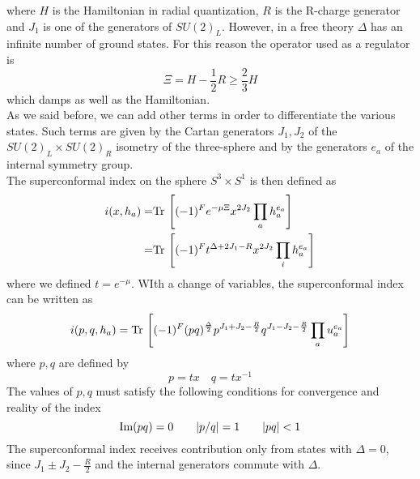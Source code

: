  where $H$ is the Hamiltonian in radial quantization, $R$ is the R-charge generator and $J_1$ is one of the generators of $SU(2)_L$. 
 However, in a free theory $\Delta$ has an infinite number of ground states. 
 For this reason the operator used as a regulator is \cite{Romelsberger:2005eg}
 \begin{equation}
 	\Xi = H - \frac{1}{2} R \geq \frac{2}{3} H 
 \end{equation}
 which damps as well as the Hamiltonian.\\
As we said before, we can add other terms in order to differentiate the various states.
Such terms are given by the Cartan generators $J_1, J_2$ of the $SU(2)_L \times SU(2)_R$ isometry of the three-sphere and by the generators $e_a$ of the internal symmetry group.\\
The superconformal index on the sphere $S^3 \times S^1$ is then defined as \cite{Romelsberger:2007ec}
\begin{align}
 i( x, h_a) =&
\mathrm{Tr } \, \left[ (-1)^F  e^{ - \mu \Xi} x^{2 J_2} \prod_a h_a^{e_a} \right] \\= &
\mathrm{Tr } \, \left[ (-1)^F  t^{\Delta +  2 J_1 - R} x^{2 J_2} \prod_i h_a^{e_a} \right] 
 \end{align} 
 where we defined $t = e^{- \mu}$.
WIth a change of variables, the superconformal index can be written as 
\begin{equation}
 i( p, q, h_a) =
 \Tr  \left[  (-1)^F 
 (pq)^{ \frac{\Delta}{2}} %
  p^{J_1 + J_2 - \frac{R}{2}} q^{J_1 - J_2 - \frac{R}{2} } \prod_a u_a^{e_a}    \right]
\end{equation}
where $p,q$ are defined by
\begin{equation}
p = t x \quad q = t x^{-1}
\end{equation}
The values of $p,q$ must satisfy the following conditions for convergence and reality of the index
\begin{equation}
\hbox{Im} (pq) =0 \qquad |p/q| =  1 \qquad | pq| < 1
\label{eqn:reality_convergence_condition_index}
\end{equation}
The superconformal index receives contribution only from states with $\Delta=0$, since $J_1 \pm J_2 - \frac{R}{2}$ and the internal generators commute with $\Delta$.
